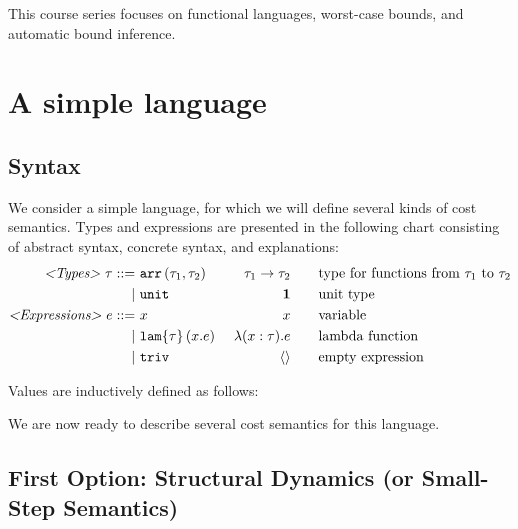 \documentclass[ manuscript,screen, nonacm]{acmart}
\begin{document}
This course series focuses on functional languages, worst-case bounds, and automatic bound inference.

\section{A simple language}
\subsection{Syntax}

We consider a simple language, 
for which we will define several kinds of cost semantics. 
Types and expressions are presented in the following chart consisting of abstract syntax, concrete syntax, and explanations:
\begin{align*}
    \textrm{\emph{<Types>}}~\tau ::=&~\mathtt{arr}\left(\tau_1,\tau_2\right) \quad &\tau_1 \rightarrow \tau_2 \quad\quad &\textrm{type for functions from $\tau_1$ to $\tau_2$}\\
    \mid&~\mathtt{unit} &\mathbf{1} \quad\quad &\textrm{unit type}
    \\
    \textrm{\emph{<Expressions>}}~e ::=&~x \quad &x \quad\quad &\textrm{variable}\\
    \mid&~\mathtt{lam}\{\tau\}\left(x.e\right) &\lambda(x:\tau).e \quad\quad &\textrm{lambda function}\\
    \mid&~\mathtt{triv} &\langle\rangle \quad\quad &\textrm{empty expression}
\end{align*}
%

Values are inductively defined as follows:

We are now ready to describe several cost semantics for this language.
\subsection{First Option: Structural Dynamics (or Small-Step Semantics)}
\end{document}
